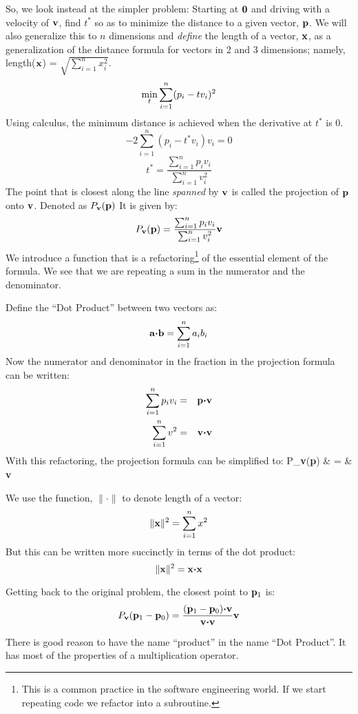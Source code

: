 \documentclass[12pt]{article}
\begin{document}
So, we look instead at the simpler problem: Starting at ${\bf 0}$ and 
driving with a velocity of ${\bf v}$, find $t^*$ so as to minimize the 
distance to a given vector, ${\bf p}$.
We will also generalize this to $n$ dimensions and {\em define\/} the 
length of a vector, ${\bf x}$, as a generalization of the distance formula 
for vectors in 2 and 3  dimensions; namely, 
length(${\bf x}$) = $\sqrt{\sum_{i=1}^n x_i^2}$.
$$ \mathop{\rm min}_{t} \sum_{i=1}^n (p_i - t v_i)^2 $$
Using calculus, the minimum distance is achieved when the derivative 
at $t^*$ is $0$.
$$ -2 \sum_{i=1}^n (p_i - t^* v_i)v_i = 0$$
$$t^* = \frac{\sum_{i=1}^n p_i v_i}{\sum_{i=1}^n v_i^2}$$
The point that is closest along the line {\em spanned\/} by ${\bf v}$ is 
called the projection of ${\bf p}$ onto ${\bf v}$.
Denoted as $P_{\bf v}({\bf p})$
It is given by:
$$ P_{\bf v}({\bf p}) = \frac{\sum_{i=1}^n p_i v_i}{\sum_{i=1}^n v_i^2} \bf v $$
We introduce a function that is a refactoring\footnote{This is a common 
practice in the software engineering world. If we start repeating code we refactor into 
a subroutine.} of the essential element of the formula. 
We see that we are repeating a sum in the numerator and the denominator.

Define the ``Dot Product'' between two vectors as: 
$${\bf a} {\boldsymbol \cdot} {\bf b} = \sum_{i=1}^n a_i b_i$$
Now the numerator and denominator in the fraction in the projection 
formula can be written:
\begin{eqnarray*}
  \sum_{i=1}^n p_i v_i & = & {\bf p} {\boldsymbol \cdot} {\bf v} \\
  \sum_{i=1}^n v^2 & = & {\bf v} {\boldsymbol \cdot} {\bf v}
\end{eqnarray*}
With this refactoring, the projection formula can be simplified to:
\be
  P_{\bf v}({\bf p}) & = &  {\bf v}
\ee

We use the function, $\| \cdot \|$ to denote length of a vector:
$$ \|{\bf x}\|^2 = \sum_{i=1}^n x^2$$
But this can be written more succinctly in terms of the dot product: 
$$ \|{\bf x}\|^2 = {\bf x} {\boldsymbol \cdot} {\bf x} $$


Getting back to the original problem, the closest point to ${\bf p}_1$ is:
$$ P_{\bf v}({\bf p}_1 - {\bf p}_0) = \frac{({\bf p}_1 - {\bf p}_0) 
    {\boldsymbol \cdot}{\bf v}}{{\bf v} {\boldsymbol \cdot} {\bf v}} {\bf v}$$

There is good reason to have the name ``product'' in the name ``Dot Product''. 
It has most of the properties of a multiplication operator.
\end{document}
